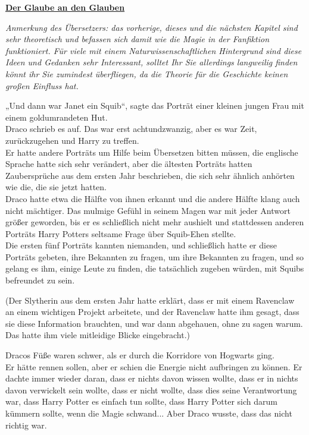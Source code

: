 

\hypertarget{der-glaube-an-den-glauben}{%

\textbf{\uline{Der Glaube an den Glauben}}

\emph{Anmerkung des Übersetzers: das vorherige, dieses und die nächsten Kapitel sind sehr theoretisch und befassen sich damit wie die Magie in der Fanfiktion funktioniert. Für viele mit einem Naturwissenschaftlichen Hintergrund sind diese Ideen und Gedanken sehr Interessant, solltet Ihr Sie allerdings langweilig finden könnt ihr Sie zumindest überfliegen, da die Theorie für die Geschichte keinen großen Einfluss hat.}

„Und dann war Janet ein Squib“, sagte das Porträt einer kleinen jungen Frau mit einem goldumrandeten Hut.\\ Draco schrieb es auf. Das war erst achtundzwanzig, aber es war Zeit, zurückzugehen und Harry zu treffen.\\ Er hatte andere Porträts um Hilfe beim Übersetzen bitten müssen, die englische Sprache hatte sich sehr verändert, aber die ältesten Porträts hatten Zaubersprüche aus dem ersten Jahr beschrieben, die sich sehr ähnlich anhörten wie die, die sie jetzt hatten.\\ Draco hatte etwa die Hälfte von ihnen erkannt und die andere Hälfte klang auch nicht mächtiger. Das mulmige Gefühl in seinem Magen war mit jeder Antwort größer geworden, bis er es schließlich nicht mehr aushielt und stattdessen anderen Porträts Harry Potters seltsame Frage über Squib-Ehen stellte.\\ Die ersten fünf Porträts kannten niemanden, und schließlich hatte er diese Porträts gebeten, ihre Bekannten zu fragen, um ihre Bekannten zu fragen, und so gelang es ihm, einige Leute zu finden, die tatsächlich zugeben würden, mit Squibs befreundet zu sein.

(Der Slytherin aus dem ersten Jahr hatte erklärt, dass er mit einem Ravenclaw an einem wichtigen Projekt arbeitete, und der Ravenclaw hatte ihm gesagt, dass sie diese Information brauchten, und war dann abgehauen, ohne zu sagen warum.\\ Das hatte ihm viele mitleidige Blicke eingebracht.)

Dracos Füße waren schwer, als er durch die Korridore von Hogwarts ging.\\ Er hätte rennen sollen, aber er schien die Energie nicht aufbringen zu können. Er dachte immer wieder daran, dass er nichts davon wissen wollte, dass er in nichts davon verwickelt sein wollte, dass er nicht wollte, dass dies seine Verantwortung war, dass Harry Potter es einfach tun sollte, dass Harry Potter sich darum kümmern sollte, wenn die Magie schwand... Aber Draco wusste, dass das nicht richtig war.

}
